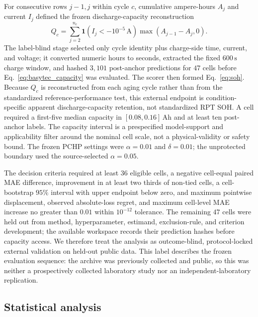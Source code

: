 \documentclass[preprint,12pt]{elsarticle}
\begin{document}
For consecutive rows $j-1,j$ within cycle $c$, cumulative ampere-hours $A_j$ and current $I_j$ defined the frozen discharge-capacity reconstruction
\begin{equation}
Q_c=\sum_{j=2}^{n_c}\mathbf{1}\!\left(I_j<-10^{-5}\,\mathrm{A}\right)
\max(A_{j-1}-A_j,0).
\label{eq:basytec_capacity}
\end{equation}
The label-blind stage selected only cycle identity plus charge-side time, current, and voltage; it converted numeric hours to seconds, extracted the fixed $600\,\mathrm{s}$ charge window, and hashed $3{,}101$ post-anchor predictions for $47$ cells before Eq.~\eqref{eq:basytec_capacity} was evaluated. The scorer then formed Eq.~\eqref{eq:soh}. Because $Q_c$ is reconstructed from each aging cycle rather than from the standardized reference-performance test, this external endpoint is condition-specific apparent discharge-capacity retention, not standardized RPT SOH. A cell required a first-five median capacity in $[0.08,0.16]\,\mathrm{Ah}$ and at least ten post-anchor labels. The capacity interval is a prespecified model-support and applicability filter around the nominal cell scale, not a physical-validity or safety bound. The frozen PCHP settings were $\alpha=0.01$ and $\delta=0.01$; the unprotected boundary used the source-selected $\alpha=0.05$.

The decision criteria required at least $36$ eligible cells, a negative cell-equal paired MAE difference, improvement in at least two thirds of non-tied cells, a cell-bootstrap $95\%$ interval with upper endpoint below zero, and maximum pointwise displacement, observed absolute-loss regret, and maximum cell-level MAE increase no greater than $0.01$ within $10^{-12}$ tolerance. The remaining $47$ cells were held out from method, hyperparameter, estimand, exclusion-rule, and criterion development; the available workspace records their prediction hashes before capacity access. We therefore treat the analysis as outcome-blind, protocol-locked external validation on held-out public data. This label describes the frozen evaluation sequence: the archive was previously collected and public, so this was neither a prospectively collected laboratory study nor an independent-laboratory replication.

\subsection{Statistical analysis}
\end{document}
